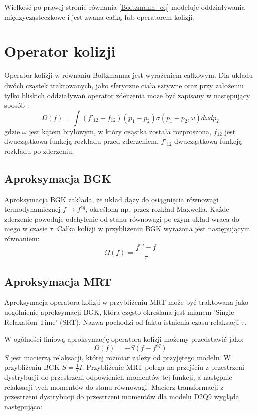 \documentclass[a4paper,11pt,twoside]{article}
\begin{document}
Wielkość po prawej stronie równania \ref{Boltzmann_eq} modeluje oddziaływania międzycząsteczkowe i jest zwana całką lub operatorem kolizji.

\section{Operator kolizji}
Operator kolizji w równaniu Boltzmanna jest wyrażeniem całkowym. Dla układu dwóch cząstek traktowanych, jako sferyczne ciała sztywne oraz przy założeniu tylko bliskich oddziaływań operator zderzenia może być zapisany w następujący sposób\cite{huang} :
\begin{equation}
\Omega(f) = \int (f'_{12} - f_{12})(p_1 - p_2) \sigma(p_1 - p_2, \omega ) d\omega dp_2
\label{collision_eq}
\end{equation}
gdzie $\omega$ jest kątem bryłowym, w który cząstka została rozproszona, $f_{12}$ jest dwucząstkową funkcją rozkładu przed zderzeniem, $f'_{12}$ dwucząstkową funkcją rozkładu po zderzeniu.
\subsection{Aproksymacja BGK}
Aproksymacja BGK zakłada, że układ dąży do osiągnięcia równowagi termodynamicznej $f \rightarrow f^{eq}$, określoną np. przez rozkład Maxwella. Każde zderzenie powoduje odchylenie od stanu równowagi po czym układ wraca do niego w czasie $\tau$. Całka kolizji w przybliżeniu BGK wyrażona jest następującym równaniem:
\begin{equation}
\Omega(f) = \frac{f^{eq}-f}{\tau}
\label{BGK_eq}
\end{equation}


\subsection{Aproksymacja MRT}
Aproksymacja operatora kolizji w przybliżeniu MRT może być traktowana jako uogólnienie aproksymacji BGK, która często określana jest mianem 'Single Relaxation Time' (SRT). Nazwa pochodzi od faktu istnienia czasu relaksacji $\tau$.

W ogólności liniową aproksymację operatora kolizji możemy przedstawić jako:
\begin{equation}
\Omega(f) = -S(f- f^{eq})
\label{relaxation_eq}
\end{equation}
$S$ jest macierzą relaksacji, której rozmiar zależy od przyjętego modelu. W przybliżeniu BGK $S=\frac{1}{\tau}I$.
Przybliżenie MRT polega na przejściu z przestrzeni dystrybucji do przestrzeni odpowienich momentów tej funkcji, a następnie relaksacji tych momentów do stanu równowagi. Macierz transformacji z przestrzeni dystrybucji do przestrzeni momentów dla modelu D2Q9 wygląda następująco:
\end{document}
